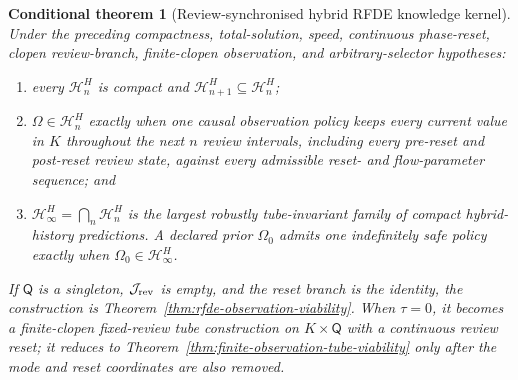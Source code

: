 \documentclass[11pt]{article}
\newtheorem{conditionaltheorem}{Conditional theorem}
\theoremstyle{definition}
\begin{document}
\begin{conditionaltheorem}[Review-synchronised hybrid RFDE knowledge kernel]
\label{thm:review-hybrid-rfde-kernel}
Under the preceding compactness, total-solution, speed, continuous
phase-reset, clopen review-branch, finite-clopen observation, and
arbitrary-selector hypotheses:
\begin{enumerate}
\item every $\mathcal H_n^H$ is compact and
$\mathcal H_{n+1}^H\subseteq\mathcal H_n^H$;
\item $\Omega\in\mathcal H_n^H$ exactly when one causal observation policy
keeps every current value in $K$ throughout the next $n$ review intervals,
including every pre-reset and post-reset review state, against every
admissible reset- and flow-parameter sequence; and
\item $\mathcal H_\infty^H=\bigcap_n\mathcal H_n^H$ is the largest robustly
tube-invariant family of compact hybrid-history predictions.  A declared
prior $\Omega_0$ admits one indefinitely safe policy exactly when
$\Omega_0\in\mathcal H_\infty^H$.
\end{enumerate}
If $\mathsf Q$ is a singleton, $\mathcal J_{\rm rev}$ is empty, and the
reset branch is the identity, the construction is
Theorem~\ref{thm:rfde-observation-viability}.  When $\tau=0$, it becomes a
finite-clopen fixed-review tube construction on $K\times\mathsf Q$ with a
continuous review reset; it reduces to
Theorem~\ref{thm:finite-observation-tube-viability} only after the mode and
reset coordinates are also removed.
\end{conditionaltheorem}
\end{document}
